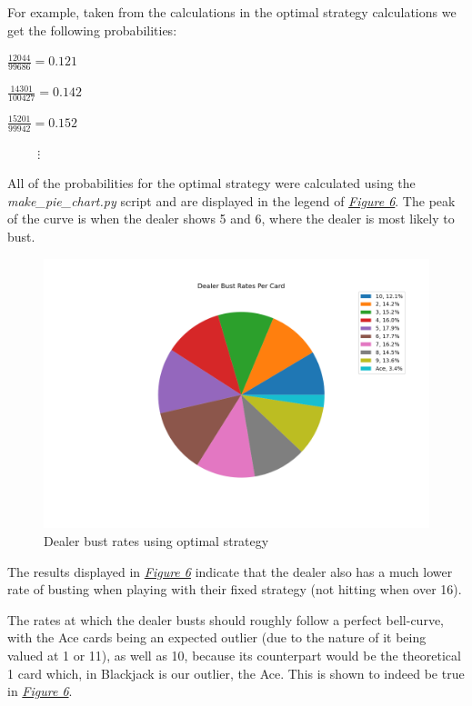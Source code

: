 \documentclass{article}
\begin{document}
{		For example, taken from the calculations in the optimal strategy calculations we get the following probabilities:

		$\frac{12044}{99686} = 0.121$

		$\frac{14301}{100427} = 0.142$

		$\frac{15201}{99942} = 0.152$

		$\hspace{1cm}\vdots$

		All of the probabilities for the optimal strategy were calculated using the \textit{make\_pie\_chart.py} script and are displayed in
		the legend of \hyperlink{fig6}{\textit{Figure 6}}. The peak of the curve is when the dealer shows 5 and 6, where the dealer is most likely
		to bust.

		\begin{figure}[H]
			\hypertarget{fig6}{}
			\begin{center}
				\includegraphics[width=15.5cm]{dealer-pie-chart-optimal.png}
				\caption{Dealer bust rates using optimal strategy}
			\end{center}
		\end{figure}

		The results displayed in \hyperlink{fig6}{\textit{Figure 6}} indicate that the dealer also has a much lower rate of busting
		when playing with their fixed strategy (not hitting when over 16). 

		The rates at which the dealer busts should roughly follow a perfect bell-curve, with the Ace cards being an expected outlier (due
		to the nature of it being valued at 1 or 11), as well as 10, because its counterpart would be the theoretical 1 card which, in Blackjack
		is our outlier, the Ace.
		This is shown to indeed be true in \hyperlink{fig6}{\textit{Figure 6}}.

}
\end{document}
